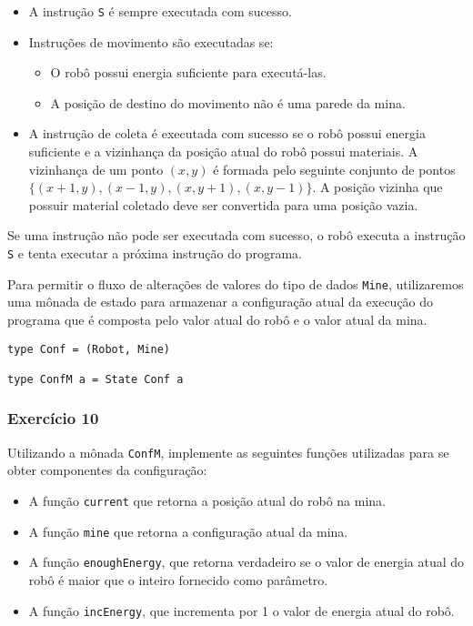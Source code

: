 \documentclass[a4paper]{article}
\begin{document}
\begin{itemize}
\item A instrução \texttt{S} é sempre executada com sucesso.
\item Instruções de movimento são executadas se:
\begin{itemize}
\item O robô possui energia suficiente para executá-las.
\item A posição de destino do movimento não é uma parede da mina.
\end{itemize}
\item A instrução de coleta é executada com sucesso se o robô possui energia suficiente e
a vizinhança da posição atual do robô possui materiais. A vizinhança de um ponto
\((x,y)\) é formada pelo seguinte conjunto de pontos \(\{(x+1,y),(x-1,y),(x,y+1),(x,y-1)\}\).
A posição vizinha que possuir material coletado deve ser convertida para uma posição vazia.
\end{itemize}

Se uma instrução não pode ser executada com sucesso, o robô executa a instrução \texttt{S} e
tenta executar a próxima instrução do programa.

Para permitir o fluxo de alterações de valores do tipo de dados \texttt{Mine}, utilizaremos
uma mônada de estado para armazenar a configuração atual da execução do programa que é composta
pelo valor atual do robô e o valor atual da mina.

\begin{verbatim}
type Conf = (Robot, Mine)

type ConfM a = State Conf a
\end{verbatim}

\subsubsection{Exercício 10}
\label{sec:orgc680fbc}

Utilizando a mônada \texttt{ConfM}, implemente as seguintes funções
utilizadas para se obter componentes da configuração:

\begin{itemize}
\item A função \texttt{current} que retorna a posição atual do robô na mina.
\item A função \texttt{mine} que retorna a configuração atual da mina.
\item A função \texttt{enoughEnergy}, que retorna verdadeiro se
o valor de energia atual do robô é maior que o inteiro fornecido como parâmetro.
\item A função \texttt{incEnergy}, que incrementa por 1 o valor de energia atual
do robô.
\end{itemize}
\end{document}
